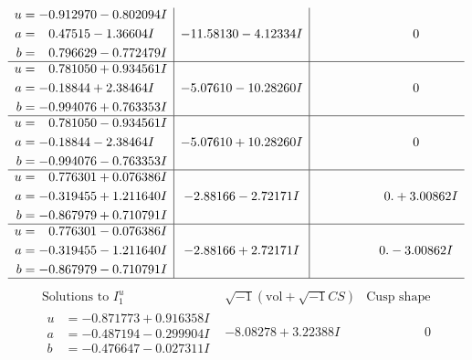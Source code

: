 \documentclass[1p]{elsarticle_modified}
\theoremstyle{definition}
\newcommand{\I}{\sqrt{-1}}
\begin{document}
$$\begin{array}{c|c|c}
\begin{aligned}
u &= -0.912970 - 0.802094 I \\
a &= \phantom{-}0.47515 - 1.36604 I \\
b &= \phantom{-}0.796629 - 0.772479 I\end{aligned}
 & -11.58130 - 4.12334 I & \phantom{-0.000000 } 0 \\ \hline\begin{aligned}
u &= \phantom{-}0.781050 + 0.934561 I \\
a &= -0.18844 + 2.38464 I \\
b &= -0.994076 + 0.763353 I\end{aligned}
 & -5.07610 - 10.28260 I & \phantom{-0.000000 } 0 \\ \hline\begin{aligned}
u &= \phantom{-}0.781050 - 0.934561 I \\
a &= -0.18844 - 2.38464 I \\
b &= -0.994076 - 0.763353 I\end{aligned}
 & -5.07610 + 10.28260 I & \phantom{-0.000000 } 0 \\ \hline\begin{aligned}
u &= \phantom{-}0.776301 + 0.076386 I \\
a &= -0.319455 + 1.211640 I \\
b &= -0.867979 + 0.710791 I\end{aligned}
 & -2.88166 - 2.72171 I & \phantom{-0.000000 -}0. + 3.00862 I \\ \hline\begin{aligned}
u &= \phantom{-}0.776301 - 0.076386 I \\
a &= -0.319455 - 1.211640 I \\
b &= -0.867979 - 0.710791 I\end{aligned}
 & -2.88166 + 2.72171 I & \phantom{-0.000000 } 0. - 3.00862 I\\
 \hline 
 \end{array}$$\newpage$$\begin{array}{c|c|c}  
\text{Solutions to }I^u_{1}& \I (\text{vol} + \sqrt{-1}CS) & \text{Cusp shape}\\
 \hline 
\begin{aligned}
u &= -0.871773 + 0.916358 I \\
a &= -0.487194 - 0.299904 I \\
b &= -0.476647 - 0.027311 I\end{aligned}
 & -8.08278 + 3.22388 I & \phantom{-0.000000 } 0 \\ \hline\begin{aligned}

\end{aligned}
\end{array}$$
\end{document}
